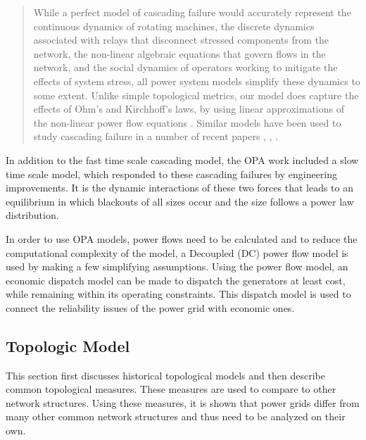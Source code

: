 \begin{quote}
While a perfect model of cascading failure would accurately represent the continuous dynamics of rotating machines, the discrete dynamics associated with relays that disconnect stressed components from the network, the non-linear algebraic equations that govern flows in the network, and the social dynamics of operators working to mitigate the effects of system stress, all power system models simplify these dynamics to some extent. Unlike simple topological metrics, our model does capture the effects of Ohm's and Kirchhoff's laws, by using linear approximations of the non-linear power flow equations \cite{bergen_1986}. Similar models have been used to study cascading failure in a number of recent papers \cite{carreras_2004}, \cite{dobson_2007}, \cite{mei_2009}.
\end{quote}

In addition to the fast time scale cascading model, the OPA work included a slow time scale model, which responded to these cascading failures by engineering improvements.  It is the dynamic interactions of these two forces that leads to an equilibrium in which blackouts of all sizes occur and the size follows a power law distribution.

In order to use OPA models, power flows need to be calculated and to reduce the computational complexity of the model, a Decoupled (DC) power flow model is used by making a few simplifying assumptions.  Using the power flow model, an economic dispatch model can be made to dispatch the generators at least cost, while remaining within its operating constraints.  This dispatch model is used to connect the reliability issues of the power grid with economic ones.

\subsection{Topologic Model}

This section first discusses historical topological models and then describe common topological measures.  These measures are used to compare to other network structures.  Using these measures, it is shown that power grids differ from many other common network structures and thus need to be analyzed on their own.  


